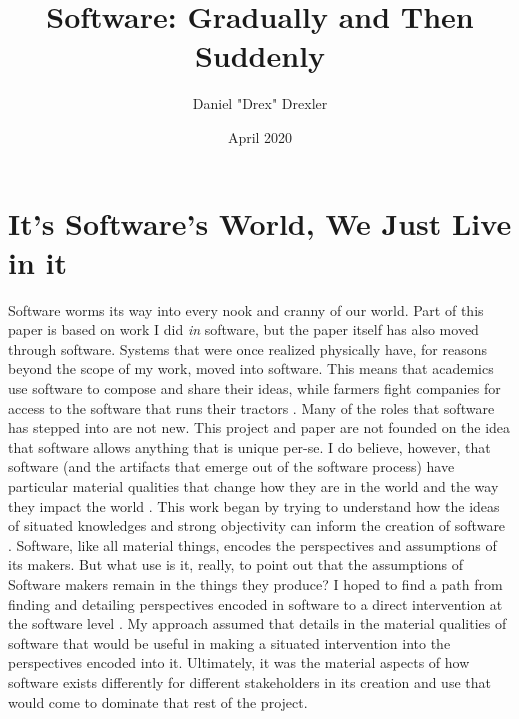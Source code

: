\documentclass[a4paper,man,natbib]{apa6}
\title{Software: Gradually and Then Suddenly}
\author{Daniel "Drex" Drexler}
\affiliation{Center for Science, Technology and Society at Drexel University}
\date{April 2020}
\begin{document}
   \maketitle
   \section*{It's Software's World, We Just Live in it}
   Software worms its way into every nook and cranny of our world. Part of this paper is based on work I did \textit{in} software, but the paper itself has also moved through software. Systems that were once realized physically have, for reasons beyond the scope of my work, moved into software. This means that academics use software to compose and share their ideas, while farmers fight companies for access to the software that runs their tractors \citep{Koebler2017-dt}. Many of the roles that software has stepped into are not new. This project and paper are not founded on the idea that software allows anything that is unique per-se. I do believe, however, that software (and the artifacts that emerge out of the software process) have particular material qualities that change how they are in the world and the way they impact the world \citep{Mackenzie2006-hb, Kitchin2011-af}. This work began by trying to understand how the ideas of situated knowledges and strong objectivity can inform the creation of software \citep{Harding1992-od,Haraway1988-nh}. Software, like all material things, encodes the perspectives and assumptions of its makers. But what use is it, really, to point out that the assumptions of Software makers remain in the things they produce? I hoped to find a path from finding and detailing perspectives encoded in software to a direct intervention at the software level \citep{Zuiderent-Jerak2015-go}. My approach assumed that details in the material qualities of software that would be useful in making a situated intervention into the perspectives encoded into it. Ultimately, it was the material aspects of how software exists differently for different stakeholders in its creation and use that would come to dominate that rest of the project.
\end{document}
